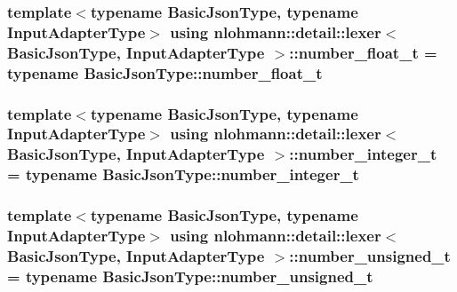 \subsubsection[{\texorpdfstring{number\+\_\+float\+\_\+t}{number_float_t}}]{\setlength{\rightskip}{0pt plus 5cm}template$<$typename Basic\+Json\+Type, typename Input\+Adapter\+Type$>$ using {\bf nlohmann\+::detail\+::lexer}$<$ Basic\+Json\+Type, Input\+Adapter\+Type $>$\+::{\bf number\+\_\+float\+\_\+t} =  typename Basic\+Json\+Type\+::number\+\_\+float\+\_\+t\hspace{0.3cm}{\ttfamily [private]}}\hypertarget{classnlohmann_1_1detail_1_1lexer_a438a78e53120fd2c3ea049161d4798cb}{}\label{classnlohmann_1_1detail_1_1lexer_a438a78e53120fd2c3ea049161d4798cb}
\subsubsection[{\texorpdfstring{number\+\_\+integer\+\_\+t}{number_integer_t}}]{\setlength{\rightskip}{0pt plus 5cm}template$<$typename Basic\+Json\+Type, typename Input\+Adapter\+Type$>$ using {\bf nlohmann\+::detail\+::lexer}$<$ Basic\+Json\+Type, Input\+Adapter\+Type $>$\+::{\bf number\+\_\+integer\+\_\+t} =  typename Basic\+Json\+Type\+::number\+\_\+integer\+\_\+t\hspace{0.3cm}{\ttfamily [private]}}\hypertarget{classnlohmann_1_1detail_1_1lexer_a594e61f96c87b4464beeab681111ac0c}{}\label{classnlohmann_1_1detail_1_1lexer_a594e61f96c87b4464beeab681111ac0c}
\subsubsection[{\texorpdfstring{number\+\_\+unsigned\+\_\+t}{number_unsigned_t}}]{\setlength{\rightskip}{0pt plus 5cm}template$<$typename Basic\+Json\+Type, typename Input\+Adapter\+Type$>$ using {\bf nlohmann\+::detail\+::lexer}$<$ Basic\+Json\+Type, Input\+Adapter\+Type $>$\+::{\bf number\+\_\+unsigned\+\_\+t} =  typename Basic\+Json\+Type\+::number\+\_\+unsigned\+\_\+t\hspace{0.3cm}{\ttfamily [private]}}\hypertarget{classnlohmann_1_1detail_1_1lexer_af6b19ef34b2e9ee2321cfaf62ee066cb}{}\label{classnlohmann_1_1detail_1_1lexer_af6b19ef34b2e9ee2321cfaf62ee066cb}
